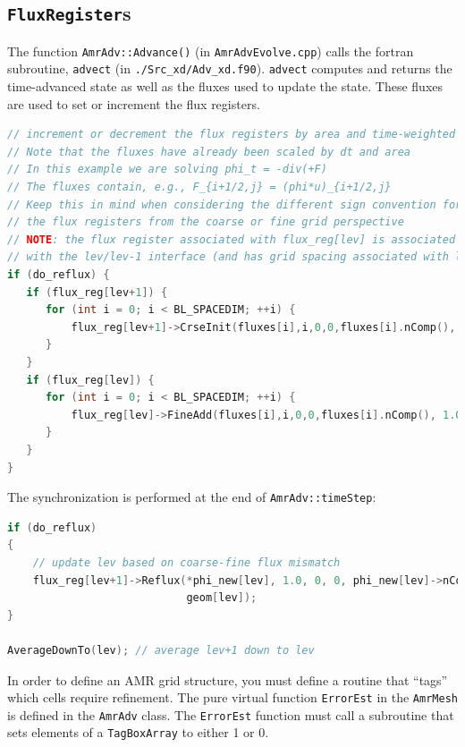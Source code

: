 \subsection{{\tt FluxRegister}s}
The function {\tt AmrAdv::Advance()} (in {\tt AmrAdvEvolve.cpp}) calls the fortran
subroutine, {\tt advect} (in {\tt ./Src\_xd/Adv\_xd.f90}).  {\tt advect} computes
and returns the time-advanced state as well as the fluxes used to update the state.
These fluxes are used to set or increment the flux registers.
\begin{lstlisting}[language=cpp]
// increment or decrement the flux registers by area and time-weighted fluxes
// Note that the fluxes have already been scaled by dt and area
// In this example we are solving phi_t = -div(+F)
// The fluxes contain, e.g., F_{i+1/2,j} = (phi*u)_{i+1/2,j}
// Keep this in mind when considering the different sign convention for updating
// the flux registers from the coarse or fine grid perspective
// NOTE: the flux register associated with flux_reg[lev] is associated
// with the lev/lev-1 interface (and has grid spacing associated with lev-1)
if (do_reflux) { 
   if (flux_reg[lev+1]) {
      for (int i = 0; i < BL_SPACEDIM; ++i) {
          flux_reg[lev+1]->CrseInit(fluxes[i],i,0,0,fluxes[i].nComp(), -1.0);
      }	    
   }
   if (flux_reg[lev]) {
      for (int i = 0; i < BL_SPACEDIM; ++i) {
          flux_reg[lev]->FineAdd(fluxes[i],i,0,0,fluxes[i].nComp(), 1.0);
      }
   }
}
\end{lstlisting}
The synchronization is performed at the end of {\tt AmrAdv::timeStep}:
\begin{lstlisting}[language=cpp]
if (do_reflux)
{
    // update lev based on coarse-fine flux mismatch
    flux_reg[lev+1]->Reflux(*phi_new[lev], 1.0, 0, 0, phi_new[lev]->nComp(),
                            geom[lev]);
}

AverageDownTo(lev); // average lev+1 down to lev
\end{lstlisting}

In order to define an AMR grid structure, you must define a routine that ``tags'' which
cells require refinement.  The pure virtual function {\tt ErrorEst} in the {\tt AmrMesh}
is defined in the {\tt AmrAdv} class.  The {\tt ErrorEst} function must call a subroutine
that sets elements of a {\tt TagBoxArray} to either 1 or 0.
